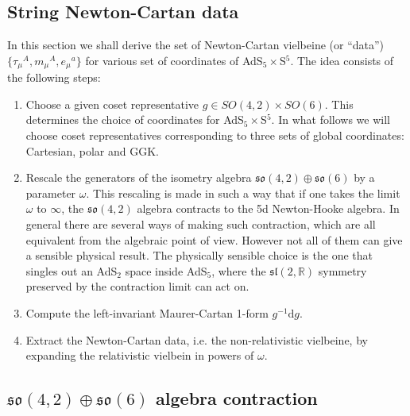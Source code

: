 \documentclass[12pt]{article}
\def\dd{\text{d}}
\numberwithin{equation}{section}
\begin{document}
\begin{appendices}


\section{String Newton-Cartan data}
\label{Appx_NCdata}

In this section we shall derive the set of Newton-Cartan vielbeine (or ``data'') $\{ \tau_{\mu}{}^A , m_{\mu}{}^A, e_{\mu}{}^a\}$ for various set of coordinates of AdS$_5\times$S$^5$. The idea consists of the following steps:
\begin{enumerate}
\item Choose a given coset representative $g \in SO(4,2)\times SO(6)$. This determines the choice of coordinates for AdS$_5\times$S$^5$. In what follows we will choose coset representatives corresponding to three sets of global coordinates: Cartesian, polar and GGK. 
\item Rescale the generators of the isometry algebra $\mathfrak{so}(4,2)\oplus\mathfrak{so}(6)$ by a parameter $\omega$. This rescaling is made in such a way that if one takes the limit $\omega$ to $\infty$, the $\mathfrak{so}(4,2)$ algebra contracts to the 5d Newton-Hooke algebra. In general there are several ways of making such contraction, which are all equivalent from the algebraic point of view. However not all of them can give a sensible physical result.  The physically sensible choice is the one that singles out an AdS$_2$ space inside AdS$_5$, where the $\mathfrak{sl}(2, \mathbb{R})$ symmetry preserved by the contraction limit can act on. 
\item Compute the left-invariant Maurer-Cartan 1-form $g^{-1} \dd g$.
\item Extract the Newton-Cartan data, i.e. the non-relativistic vielbeine, by expanding the relativistic vielbein in powers of $\omega$. 
\end{enumerate}


\subsection{$\mathfrak{so}(4,2)\oplus\mathfrak{so}(6)$ algebra contraction}


\end{appendices}
\end{document}
